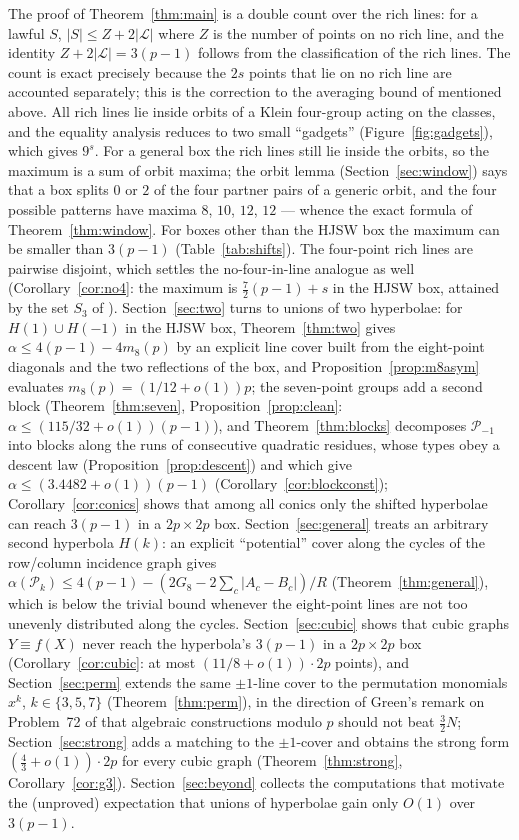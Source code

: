 \documentclass[11pt]{article}
\theoremstyle{remark}
\newcommand{\Lc}{\mathcal{L}}
\newcommand{\Pset}{\mathcal{P}}
\begin{document}
The proof of Theorem~\ref{thm:main} is a double count over the rich lines: for a lawful $S$, $|S|\le Z+2|\Lc|$ where $Z$ is
the number of points on no rich line, and the identity $Z+2|\Lc|=3(p-1)$ follows from the classification of the rich lines.  The count is
exact precisely because the $2s$ points that lie on no rich line are accounted separately; this is the correction to
the averaging bound of \cite{KNS25} mentioned above.  All rich lines lie inside orbits of a Klein four-group acting on
the classes, and the equality analysis reduces to two small ``gadgets'' (Figure~\ref{fig:gadgets}), which gives $9^s$.
For a general box the rich lines still lie inside the orbits, so the maximum is a sum of orbit maxima; the orbit lemma
(Section~\ref{sec:window}) says that a box splits $0$ or $2$ of the four partner pairs of a generic orbit, and the four
possible patterns have maxima $8$, $10$, $12$, $12$ --- whence the exact formula of Theorem~\ref{thm:window}.  For boxes
other than the HJSW box the maximum can be smaller than $3(p-1)$ (Table~\ref{tab:shifts}).
The four-point rich lines are pairwise disjoint, which settles the no-four-in-line analogue as well
(Corollary~\ref{cor:no4}: the maximum is $\tfrac72(p-1)+s$ in the HJSW box, attained by the set $S_3$ of \cite{KNS25}).
Section~\ref{sec:two} turns to unions of two hyperbolae: for $H(1)\cup H(-1)$ in the HJSW box, Theorem~\ref{thm:two} gives
$\alpha\le4(p-1)-4m_8(p)$ by an explicit line cover built from the eight-point diagonals and the two reflections of the box, and
Proposition~\ref{prop:m8asym} evaluates $m_8(p)=(1/12+o(1))p$; the seven-point groups add a second block
(Theorem~\ref{thm:seven}, Proposition~\ref{prop:clean}: $\alpha\le(115/32+o(1))(p-1)$), and Theorem~\ref{thm:blocks} decomposes
$\Pset_{-1}$ into blocks along the runs of consecutive quadratic residues, whose types obey a descent law
(Proposition~\ref{prop:descent}) and which give $\alpha\le(3.4482+o(1))(p-1)$ (Corollary~\ref{cor:blockconst});
Corollary~\ref{cor:conics} shows that among all conics only the shifted
hyperbolae can reach $3(p-1)$ in a $2p\times2p$ box.  Section~\ref{sec:general} treats an arbitrary second hyperbola $H(k)$: an explicit
``potential'' cover along the cycles of the row/column incidence graph gives $\alpha(\Pset_k)\le4(p-1)-(2G_8-2\sum_c|A_c-B_c|)/R$
(Theorem~\ref{thm:general}), which is below the trivial bound whenever the eight-point lines are not too unevenly distributed along the cycles.
Section~\ref{sec:cubic} shows that cubic graphs $Y\equiv f(X)$ never reach the hyperbola's $3(p-1)$ in a $2p\times2p$ box
(Corollary~\ref{cor:cubic}: at most $(11/8+o(1))\cdot2p$ points), and Section~\ref{sec:perm} extends the same $\pm1$-line cover to the
permutation monomials $x^k$, $k\in\{3,5,7\}$ (Theorem~\ref{thm:perm}), in the direction of Green's remark on Problem~72 of \cite{Green} that
algebraic constructions modulo $p$ should not beat $\tfrac32N$; Section~\ref{sec:strong} adds a matching to the $\pm1$-cover and obtains the strong
form $(\tfrac43+o(1))\cdot2p$ for every cubic graph (Theorem~\ref{thm:strong}, Corollary~\ref{cor:g3}).  Section~\ref{sec:beyond} collects the computations that motivate the (unproved)
expectation that unions of hyperbolae gain only $O(1)$ over $3(p-1)$.
\end{document}
